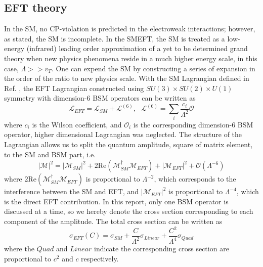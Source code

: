 \documentclass[a4paper,12pt]{article}
\begin{document}
		\subsection{EFT theory}
			\par In the SM, no CP-violation is predicted in the electroweak interactions; however, as stated, the SM is incomplete. 
            In the SMEFT, the SM is treated as a low-energy (infrared) leading order approximation of a yet to be determined grand theory when 
            new physics phenomena reside in a much higher energy scale, in this case, $\Lambda >> \bar{v}_T$. One can expend 
            the SM by constructing a series of expansion in the order of the ratio to new physics scale. With the SM Lagrangian defined in Ref. \cite{Salam:1968rm}, the
            EFT Lagrangian constructed using $SU(3)\times SU(2)\times U(1)$ symmetry with dimension-6 BSM operators can be written as 
			\begin{equation}\label{eq:lagr}
				\mathcal{L}_{EFT} = \mathcal{L}_{SM} + \mathcal{L}^{(6)},\ \ \ \mathcal{L}^{(6)} = \sum_{i}\frac{c_i}{\Lambda^2}\mathcal{O}
			\end{equation} 
			where $c_i$ is the Wilson coefficient, and $\mathcal{O}_i$ is the corresponding dimension-6 BSM operator, higher dimensional Lagrangian
			was neglected. The structure of the Lagrangian allows us to split the quantum amplitude, square of matrix element, to the SM and BSM part, i.e.
			\begin{equation}\label{eq:amp}
				|\mathcal{M}|^2 = |\mathcal{M}_{SM}|^2 + 2\text{Re}(\mathcal{M}_{SM}^\dagger\mathcal{M}_{EFT}) + |\mathcal{M}_{EFT}|^2 + \mathcal{O}(\Lambda^{-6})
			\end{equation}
			where $2\text{Re}(\mathcal{M}_{SM}^\dagger\mathcal{M}_{EFT})$ is proportional to $\Lambda^{-2}$, which corresponds to the interference 
			between the SM and EFT, and $|\mathcal{M}_{EFT}|^2$ is proportional to $\Lambda^{-4}$, which is the direct EFT contribution. 
			In this report, only one BSM operator is discussed at a time, so we hereby denote the cross 
			section corresponding to each component of the amplitude. The total cross section can be written as
			\begin{equation}\label{eq:eftxs}
			\sigma_{EFT}(C) = \sigma_{SM} + \frac{C}{\Lambda^{2}}\sigma_{Linear} + \frac{C^2}{\Lambda^{4}}\sigma_{Quad}
			\end{equation} 
			where the $Quad$ and $Linear$ indicate the corresponding cross section are proportional to $c^2$ and $c$ respectively.
\end{document}
